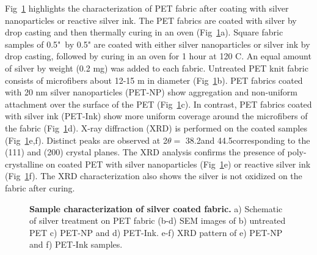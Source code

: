 \documentclass[10pt,letterpaper]{article}
\begin{document}
Fig~\ref{fig1} highlights the characterization of PET fabric after coating with silver nanoparticles or reactive silver ink.  
The PET fabrics are coated with silver by drop casting and then thermally curing in an oven %
(Fig~\ref{fig1}a).  Square fabric samples of 
0.5"~by 0.5" are coated with either silver nanoparticles or silver ink by drop casting, followed by curing in an oven for 1 hour at 120 \degree C. An equal amount of silver by weight (0.2 mg) was added to each fabric. 
Untreated PET knit fabric consists of microfibers about 12-15 \micro m in diameter (Fig~\ref{fig1}b). %
PET fabrics coated with 20 nm silver nanoparticles (PET-NP) show aggregation and non-uniform attachment over the surface of the PET (Fig~\ref{fig1}c).  
In contrast, PET fabrics %
coated with silver ink (PET-Ink) 
show more uniform coverage around the microfibers of the fabric (Fig~\ref{fig1}d). 
X-ray diffraction (XRD) is performed on the coated samples (Fig~\ref{fig1}e,f). %
Distinct peaks are observed at 2$\theta =$ 38.2\degree and 44.5\degree corresponding to the (111) and (200) crystal planes. 
The XRD analysis confirms the presence of poly-crystalline on coated PET with silver nanoparticles (Fig~\ref{fig1}e) or reactive silver ink (Fig~\ref{fig1}f). The XRD characterization also shows the silver is not oxidized on the fabric after curing.

\begin{figure}[!h]
\caption{{\bf Sample characterization of silver coated fabric.}
a) Schematic of silver treatment on PET fabric (b-d) SEM images of b) untreated PET c) PET-NP and d) PET-Ink. e-f) XRD pattern of e) PET-NP and f) PET-Ink samples.}
\label{fig1}
\end{figure}

\end{document}

